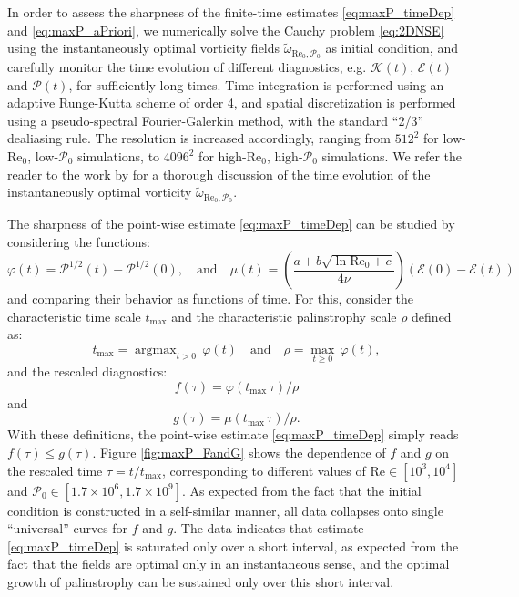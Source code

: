 \documentclass[11pt]{article}
\def\E{{\mathcal{E}}}
\def\P{{\mathcal{P}}}
\def\K{{\mathcal{K}}}
\newcommand{\Reyn}{\textrm{Re}}
\newcommand{\twRP}{\widetilde{\omega}_{\Reyn_0,\P_0}}
\begin{document}
In order to assess the sharpness of the finite-time estimates \eqref{eq:maxP_timeDep} and \eqref{eq:maxP_aPriori}, we numerically solve the Cauchy problem \eqref{eq:2DNSE} using the instantaneously optimal vorticity fields $\twRP$ as initial condition, and carefully monitor the time evolution of different diagnostics, e.g. $\K(t)$, $\E(t)$ and $\P(t)$, for sufficiently long times. Time integration is performed using an adaptive Runge-Kutta scheme of order 4, and spatial discretization is performed using a pseudo-spectral Fourier-Galerkin method, with the standard ``2/3'' dealiasing rule. The resolution is increased accordingly, ranging from $512^2$ for low-$\Reyn_0$, low-$\P_0$ simulations, to $4096^2$ for high-$\Reyn_0$, 
high-$\P_0$ simulations. We refer the reader to the work by \cite{ap13b} for a thorough discussion of the time evolution of the instantaneously optimal vorticity $\twRP$. 

The sharpness of the point-wise estimate \eqref{eq:maxP_timeDep} can be studied by considering the functions:
\[
\varphi (t) = \P^{1/2}(t) - \P^{1/2}(0), \quad \mbox{and} \quad
\mu (t) = \left(\frac{a + b \sqrt{\ln \Reyn_0+c}}{4\nu} \right)\left( \E(0) - \E(t) \right)
\]
and comparing their behavior as functions of time. For this, consider the characteristic time scale $t_{\max}$ and the characteristic palinstrophy scale $\rho$ defined as:
\[
t_{\max} = \mathop{\arg\max}_{t > 0}\, \varphi (t) \quad \mbox{and} \quad
\rho = \mathop{\max}_{t \geq 0}\, \varphi (t),
\]
and the rescaled diagnostics:
\begin{equation}
f(\tau) = \varphi(t_{\max}  \,  \tau)/\rho
\end{equation}
and
\begin{equation}
g(\tau) = \mu(t_{\max} \, \tau)/\rho.
\end{equation}
With these definitions, the point-wise estimate \eqref{eq:maxP_timeDep} simply reads $f(\tau) \leq g(\tau)$. Figure \ref{fig:maxP_FandG} shows the dependence of $f$ and $g$ on the rescaled time $\tau = t/t_{\max}$, corresponding to different values of $\Reyn\in[10^3,10^4]$ and $\P_0 \in [1.7\times 10^6, 1.7\times10^9]$. As expected from the fact that the initial condition is constructed in a self-similar manner, all data collapses onto single ``universal'' curves for $f$ and $g$. The data indicates that estimate \eqref{eq:maxP_timeDep} is saturated only over a short interval, as expected from the fact that the fields are optimal only in an instantaneous sense, and the optimal growth of palinstrophy can be sustained only over this short interval.
\end{document}
